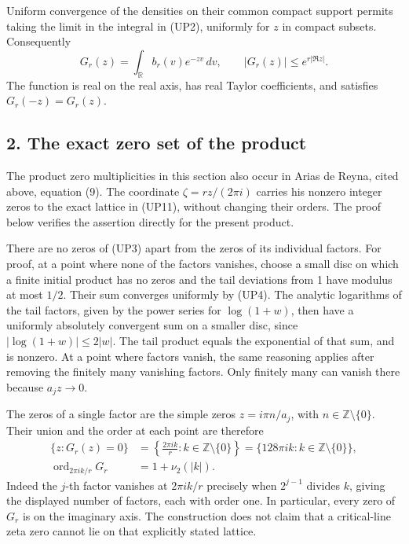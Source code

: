 \documentclass[
  10pt,
  a4paper,
]{article}
\newcounter{none} %
\begin{document}
Uniform convergence of the densities on their common compact support
permits taking the limit in the integral in (UP2), uniformly for \(z\)
in compact subsets. Consequently \[
G_r(z)=\int_{\mathbb R}b_r(v)e^{-zv}\,dv,
\qquad |G_r(z)|\le e^{r|\Re z|}.
\tag{UP10}
\] The function is real on the real axis, has real Taylor coefficients,
and satisfies \(G_r(-z)=G_r(z)\).

\subsection{2. The exact zero set of the
product}\label{the-exact-zero-set-of-the-product}

The product zero multiplicities in this section also occur in Arias de
Reyna, cited above, equation (9). The coordinate \(\zeta=rz/(2\pi i)\)
carries his nonzero integer zeros to the exact lattice in (UP11),
without changing their orders. The proof below verifies the assertion
directly for the present product.

There are no zeros of (UP3) apart from the zeros of its individual
factors. For proof, at a point where none of the factors vanishes,
choose a small disc on which a finite initial product has no zeros and
the tail deviations from 1 have modulus at most \(1/2\). Their sum
converges uniformly by (UP4). The analytic logarithms of the tail
factors, given by the power series for \(\log(1+w)\), then have a
uniformly absolutely convergent sum on a smaller disc, since
\(|\log(1+w)|\le2|w|\). The tail product equals the exponential of that
sum, and is nonzero. At a point where factors vanish, the same reasoning
applies after removing the finitely many vanishing factors. Only
finitely many can vanish there because \(a_jz\to0\).

The zeros of a single factor are the simple zeros \(z=i\pi n/a_j\), with
\(n\in\mathbb Z\setminus\{0\}\). Their union and the order at each point
are therefore \[
\begin{split}
\{z:G_r(z)=0\}
&=\left\{\frac{2\pi i k}{r}:k\in\mathbb Z\setminus\{0\}\right\}
=\{128\pi i k:k\in\mathbb Z\setminus\{0\}\},\\
\operatorname{ord}_{2\pi i k/r}G_r&=1+\nu_2(|k|).
\end{split}
\tag{UP11}
\] Indeed the \(j\)-th factor vanishes at \(2\pi i k/r\) precisely when
\(2^{j-1}\) divides \(k\), giving the displayed number of factors, each
with order one. In particular, every zero of \(G_r\) is on the imaginary
axis. The construction does not claim that a critical-line zeta zero
cannot lie on that explicitly stated lattice.
\end{document}

